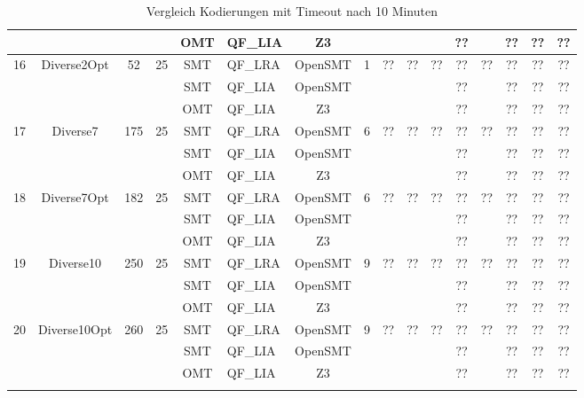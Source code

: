 \begin{landscape}
\begin{longtable}{|c|c|c|c|c|l|c|c|c|c|c|c|c|c|c|c|}
            & & & & OMT & QF\_LIA & Z3 & & & & & ?? & & ?? & ?? & ?? \\
            \hline
            \multirow{3}{*}{16} & \multirow{3}{*}{Diverse2Opt} & \multirow{3}{*}{52} & \multirow{3}{*}{25} & SMT & QF\_LRA & OpenSMT & \multirow{3}{*}{1} & \multirow{3}{*}{??} & \multirow{3}{*}{??} & \multirow{3}{*}{??} & ?? & \multirow{3}{*}{??} & ?? & ?? & ?? \\
            & & & & SMT & QF\_LIA & OpenSMT & & & & & ?? & & ?? & ?? & ?? \\
            & & & & OMT & QF\_LIA & Z3 & & & & & ?? & & ?? & ?? & ?? \\
            \hline
            \multirow{3}{*}{17} & \multirow{3}{*}{Diverse7} & \multirow{3}{*}{175} & \multirow{3}{*}{25} & SMT & QF\_LRA & OpenSMT & \multirow{3}{*}{6} & \multirow{3}{*}{??} & \multirow{3}{*}{??} & \multirow{3}{*}{??} & ?? & \multirow{3}{*}{??} & ?? & ?? & ?? \\
            & & & & SMT & QF\_LIA & OpenSMT & & & & & ?? & & ?? & ?? & ?? \\
            & & & & OMT & QF\_LIA & Z3 & & & & & ?? & & ?? & ?? & ?? \\
            \hline
            \multirow{3}{*}{18} & \multirow{3}{*}{Diverse7Opt} & \multirow{3}{*}{182} & \multirow{3}{*}{25} & SMT & QF\_LRA & OpenSMT & \multirow{3}{*}{6} & \multirow{3}{*}{??} & \multirow{3}{*}{??} & \multirow{3}{*}{??} & ?? & \multirow{3}{*}{??} & ?? & ?? & ?? \\
            & & & & SMT & QF\_LIA & OpenSMT & & & & & ?? & & ?? & ?? & ?? \\
            & & & & OMT & QF\_LIA & Z3 & & & & & ?? & & ?? & ?? & ?? \\
            \hline
            \multirow{3}{*}{19} & \multirow{3}{*}{Diverse10} & \multirow{3}{*}{250} & \multirow{3}{*}{25} & SMT & QF\_LRA & OpenSMT & \multirow{3}{*}{9} & \multirow{3}{*}{??} & \multirow{3}{*}{??} & \multirow{3}{*}{??} & ?? & \multirow{3}{*}{??} & ?? & ?? & ?? \\
            & & & & SMT & QF\_LIA & OpenSMT & & & & & ?? & & ?? & ?? & ?? \\
            & & & & OMT & QF\_LIA & Z3 & & & & & ?? & & ?? & ?? & ?? \\
            \hline
            \multirow{3}{*}{20} & \multirow{3}{*}{Diverse10Opt} & \multirow{3}{*}{260} & \multirow{3}{*}{25} & SMT & QF\_LRA & OpenSMT & \multirow{3}{*}{9} & \multirow{3}{*}{??} & \multirow{3}{*}{??} & \multirow{3}{*}{??} & ?? & \multirow{3}{*}{??} & ?? & ?? & ?? \\
            & & & & SMT & QF\_LIA & OpenSMT & & & & & ?? & & ?? & ?? & ?? \\
            & & & & OMT & QF\_LIA & Z3 & & & & & ?? & & ?? & ?? & ?? \\
            \hline
        \caption{Vergleich Kodierungen mit Timeout nach 10 Minuten}
        \label{tab:vglkodierungreal}
    \end{longtable}
\end{landscape}
